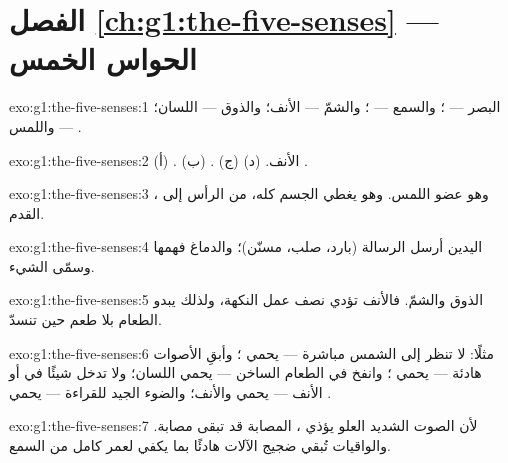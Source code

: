 \section*{الفصل \ref{ch:g1:the-five-senses} --- الحواس الخمس}

\begin{solution}{exo:g1:the-five-senses:1}
البصر --- ؛ والسمع --- ؛ والشمّ --- الأنف؛ والذوق
--- اللسان؛ واللمس --- .
\end{solution}

\begin{solution}{exo:g1:the-five-senses:2}
(أ) . (ب) . (ج) الأنف. (د) .
\end{solution}

\begin{solution}{exo:g1:the-five-senses:3}
، وهو عضو اللمس. وهو يغطي الجسم كله، من الرأس إلى القدم.
\end{solution}

\begin{solution}{exo:g1:the-five-senses:4}
 اليدين أرسل الرسالة (بارد، صلب، مسنّن)؛ والدماغ فهمها وسمّى
الشيء.
\end{solution}

\begin{solution}{exo:g1:the-five-senses:5}
الذوق والشمّ. فالأنف تؤدي نصف عمل النكهة، ولذلك يبدو الطعام بلا
طعم حين تنسدّ.
\end{solution}

\begin{solution}{exo:g1:the-five-senses:6}
مثلًا: لا تنظر إلى الشمس مباشرة --- يحمي ؛ وأبقِ الأصوات
هادئة --- يحمي ؛ وانفخ في الطعام الساخن --- يحمي اللسان؛
ولا تدخل شيئًا في  أو الأنف --- يحمي  والأنف؛ والضوء
الجيد للقراءة --- يحمي .
\end{solution}

\begin{solution}{exo:g1:the-five-senses:7}
لأن الصوت الشديد العلو يؤذي ،  المصابة قد تبقى
مصابة. والواقيات تُبقي ضجيج الآلات هادئًا بما يكفي لعمر كامل من
السمع.
\end{solution}

